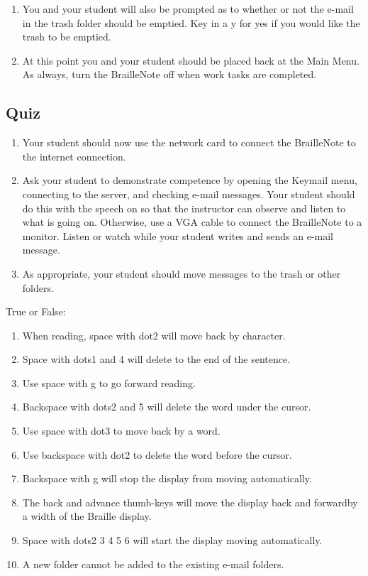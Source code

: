 \documentclass[10pt,letterpaper,twoside]{report}
\begin{document}
{{{\begin{enumerate}
	\item You and your student will also be prompted as to whether or not the e-mail in the trash folder should be emptied.  Key in a y for yes if you would like the trash to be emptied.
	\item At this point you and your student should be placed back at the Main Menu.  As always, turn the BrailleNote off when work tasks are completed.
\end{enumerate}
\clearpage

\subsection{Quiz}
\begin{enumerate}
	\item Your student should now use the network card to connect the BrailleNote to the internet connection.
	\item Ask your student to demonstrate competence by opening the Keymail menu, connecting to the server, and checking e-mail messages.  Your student should do this with the speech on so that the instructor can observe and listen to what is going on.  Otherwise, use a VGA cable to connect the BrailleNote to a monitor. Listen or watch while your student writes and sends an e-mail message.
	\item As appropriate, your student should move messages to the trash or other folders.
\end{enumerate}

True or False:
\begin{enumerate}
	\item When reading, space with dot2 will move back by character.
	\item Space with dots1 and 4 will delete to the end of the sentence.
	\item Use space with g to go forward reading.
	\item Backspace with dots2 and 5 will delete the word under the cursor.
	\item Use space with dot3 to move back by a word.
	\item Use backspace with dot2 to delete the word before the cursor.
	\item Backspace with g will stop the display from moving automatically.
	\item The back and advance thumb-keys will move the display back and forwardby a width of the Braille display.
	\item Space with dots2 3 4 5 6 will start the display moving automatically.
	\item A new folder cannot be added to the existing e-mail folders.
\end{enumerate}
\clearpage
}}}
\end{document}
